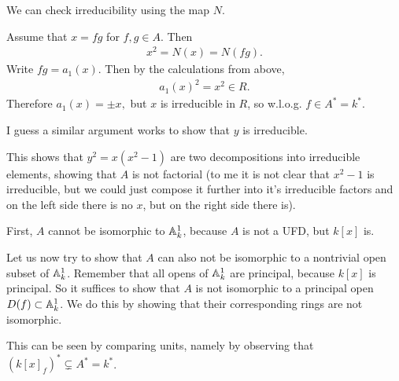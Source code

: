 \begin{exercise}{3}
\begin{enumerate}
        We can check irreducibility using the map $N.$

        Assume that $x=fg$ for $f,g\in A$. Then
        \begin{align*}
            x^2=N(x)=N(fg).
        \end{align*}
        Write $fg=a_1(x)$. Then by the calculations from above,
        \begin{align*}
            a_1(x)^2=x^2 \in R.
        \end{align*}
        Therefore $a_1(x)=\pm x,$ but $x$ is irreducible in $R$, so w.l.o.g. $f\in A^*=k^*$. 

        I guess a similar argument works to show that $y$ is irreducible.

        This shows that $y^2=x(x^2-1)$ are two decompositions into irreducible elements, showing that $A$ is not 
        factorial (to me it is not clear that $x^2-1$ is irreducible, but we could just compose it further 
        into it's irreducible factors and on the left side there is no $x$, but on the right side there is).

        First, $A$ cannot be isomorphic to $\mathbb{A}^1_k$, because $A$ is not a UFD, but $k[x]$ is.

        Let us now try to show that $A$ can also not be isomorphic to a nontrivial open subset of $\mathbb{A}^1_k$.
        Remember that all opens of $\mathbb{A}^1_k$ are principal, because $k[x]$ is principal. So it suffices to
        show that $A$ is not isomorphic to a principal open $D(f)\subset\mathbb{A}^1_k$. We do this by showing that
        their corresponding rings are not isomorphic. 
        
        This can be seen by comparing units, namely by observing that $(k[x]_f)^*\subsetneq A^*=k^*$.
    \end{enumerate}
\end{exercise}


